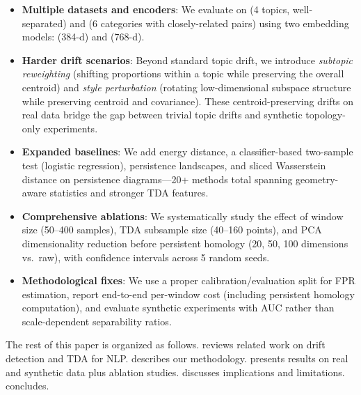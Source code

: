 \begin{itemize}[leftmargin=*,itemsep=0pt,topsep=0pt]
    \item \textbf{Multiple datasets and encoders}: We evaluate on \agnews (4 topics, well-separated) and \twentyng (6 categories with closely-related pairs) using two embedding models: \minilm (384-d) and \bertbase (768-d).
    \item \textbf{Harder drift scenarios}: Beyond standard topic drift, we introduce \emph{subtopic reweighting} (shifting proportions within a topic while preserving the overall centroid) and \emph{style perturbation} (rotating low-dimensional subspace structure while preserving centroid and covariance). These centroid-preserving drifts on real data bridge the gap between trivial topic drifts and synthetic topology-only experiments.
    \item \textbf{Expanded baselines}: We add energy distance, a classifier-based two-sample test (logistic regression), persistence landscapes, and sliced Wasserstein distance on persistence diagrams---20+ methods total spanning geometry-aware statistics and stronger TDA features.
    \item \textbf{Comprehensive ablations}: We systematically study the effect of window size (50--400 samples), TDA subsample size (40--160 points), and PCA dimensionality reduction before persistent homology (20, 50, 100 dimensions vs.\ raw), with confidence intervals across 5 random seeds.
    \item \textbf{Methodological fixes}: We use a proper calibration/evaluation split for FPR estimation, report end-to-end per-window cost (including persistent homology computation), and evaluate synthetic experiments with AUC rather than scale-dependent separability ratios.
\end{itemize}

The rest of this paper is organized as follows.  reviews related work on drift detection and TDA for NLP.  describes our methodology.  presents results on real and synthetic data plus ablation studies.  discusses implications and limitations.  concludes.
